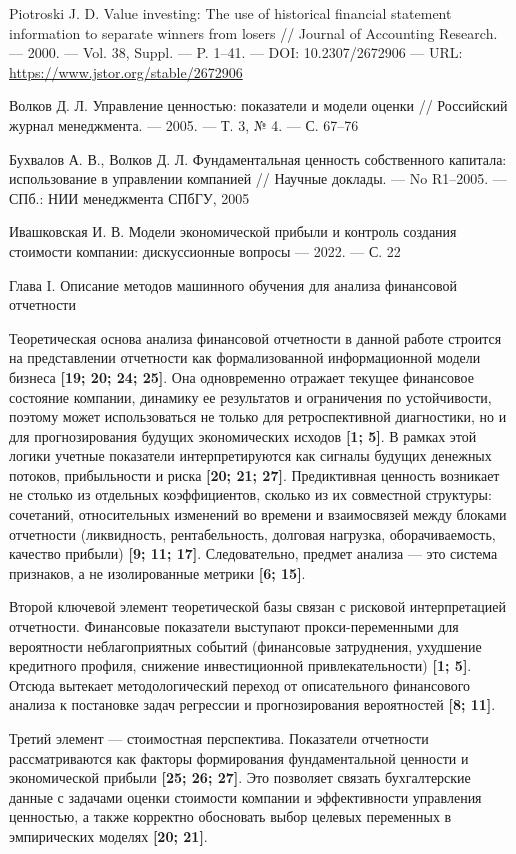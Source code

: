 \documentclass[
]{article}
\begin{document}
{  Piotroski J. D. Value investing: The use of historical financial statement information to separate winners from losers // Journal of Accounting Research. --- 2000. --- Vol. 38, Suppl. --- P. 1--41. --- DOI: 10.2307/2672906 --- URL: \url{https://www.jstor.org/stable/2672906}

  Волков Д. Л. Управление ценностью: показатели и модели оценки // Российский журнал менеджмента. --- 2005. --- Т. 3, № 4. --- С. 67--76

  Бухвалов А. В., Волков Д. Л. Фундаментальная ценность собственного капитала: использование в управлении компанией // Научные доклады. --- No R1--2005. --- СПб.: НИИ менеджмента СПбГУ, 2005

  Ивашковская И. В. Модели экономической прибыли и контроль создания стоимости компании: дискуссионные вопросы --- 2022. --- С. 22}

Глава I. Описание методов машинного обучения для анализа финансовой отчетности

Теоретическая основа анализа финансовой отчетности в данной работе строится на представлении отчетности как формализованной информационной модели бизнеса \textbf{{[}19; 20; 24; 25{]}}. Она одновременно отражает текущее финансовое состояние компании, динамику ее результатов и ограничения по устойчивости, поэтому может использоваться не только для ретроспективной диагностики, но и для прогнозирования будущих экономических исходов \textbf{{[}1; 5{]}}. В рамках этой логики учетные показатели интерпретируются как сигналы будущих денежных потоков, прибыльности и риска \textbf{{[}20; 21; 27{]}}. Предиктивная ценность возникает не столько из отдельных коэффициентов, сколько из их совместной структуры: сочетаний, относительных изменений во времени и взаимосвязей между блоками отчетности (ликвидность, рентабельность, долговая нагрузка, оборачиваемость, качество прибыли) \textbf{{[}9; 11; 17{]}}. Следовательно, предмет анализа --- это система признаков, а не изолированные метрики \textbf{{[}6; 15{]}}.

Второй ключевой элемент теоретической базы связан с рисковой интерпретацией отчетности. Финансовые показатели выступают прокси-переменными для вероятности неблагоприятных событий (финансовые затруднения, ухудшение кредитного профиля, снижение инвестиционной привлекательности) \textbf{{[}1; 5{]}}. Отсюда вытекает методологический переход от описательного финансового анализа к постановке задач регрессии и прогнозирования вероятностей \textbf{{[}8; 11{]}}.

Третий элемент --- стоимостная перспектива. Показатели отчетности рассматриваются как факторы формирования фундаментальной ценности и экономической прибыли \textbf{{[}25; 26; 27{]}}. Это позволяет связать бухгалтерские данные с задачами оценки стоимости компании и эффективности управления ценностью, а также корректно обосновать выбор целевых переменных в эмпирических моделях \textbf{{[}20; 21{]}}.
\end{document}
